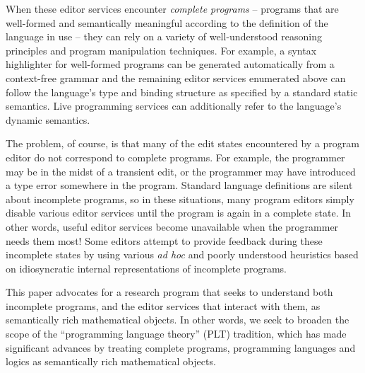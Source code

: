 \documentclass[letterpaper,USenglish]{lipics-v2016}
\begin{document}
When these editor services encounter \emph{complete programs} -- programs that are well-formed and semantically meaningful according to the definition of the language in use -- they can rely on a variety of well-understood reasoning principles and program manipulation techniques. For example, a syntax highlighter for well-formed programs can be generated automatically 
from a context-free grammar \cite{DBLP:conf/tools/KrahnRV08,DBLP:conf/cc/BrandDHJJKKMOSVVV01} and the remaining editor services enumerated above can follow the language's type and binding structure as specified by a standard static
semantics. Live programming services can additionally refer to the language's dynamic semantics.

The problem, of course, is that many of the {edit states} encountered by a program editor do not correspond to complete programs. For example, the programmer may be in the midst of a transient edit, or the programmer may have introduced a type error somewhere in the program. Standard language definitions are silent about incomplete programs, so in these situations, many program editors simply disable various editor services until the program is again in a complete state. In other words, useful editor services become unavailable when the programmer needs them most!
Some editors attempt to provide feedback during these incomplete states by using various \emph{ad hoc} and poorly understood heuristics based on idiosyncratic internal representations of  incomplete programs.

This paper advocates for a research program that seeks to understand both incomplete programs, and the editor services that interact with them, as semantically rich mathematical objects. In other words, we seek to broaden the scope of the ``programming language theory'' (PLT) tradition, which has made significant advances by treating complete programs, programming languages and logics as semantically rich mathematical objects. %
\end{document}
